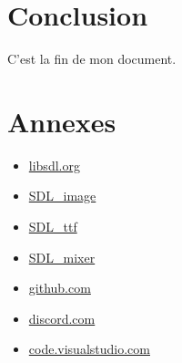 \documentclass[12pt,a4paper, twoside]{article}
\begin{document}
\section{Conclusion}
C'est la fin de mon document.

\newpage 
\section{Annexes}

\begin{itemize}
    \item \href{https://www.libsdl.org/}{libsdl.org}
    \item \href{https://www.libsdl.org/projects/SDL_image/}{SDL\_image}
    \item \href{https://www.libsdl.org/projects/SDL_ttf/}{SDL\_ttf}
    \item \href{https://www.libsdl.org/projects/SDL_mixer/}{SDL\_mixer}
    \item \href{https://github.com/}{github.com}
    \item \href{https://discord.com/}{discord.com}
    \item \href{https://code.visualstudio.com/}{code.visualstudio.com}
\end{itemize}
\end{document}
